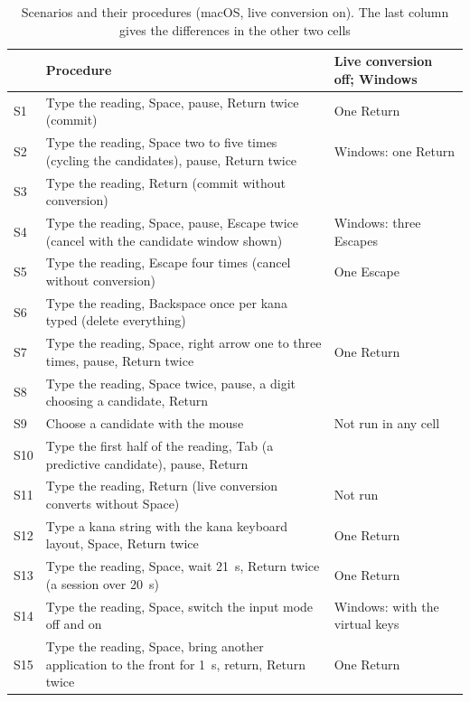 \begin{table}[t]
\caption{Scenarios and their procedures (macOS, live conversion on). The last column gives the differences in the other
two cells}
\label{tab:scenarios}
\begin{tabular}{L{0.08}L{0.52}L{0.40}}
\toprule
& Procedure & Live conversion off; Windows \\
\midrule
S1 & Type the reading, Space, pause, Return twice (commit) & One Return \\
S2 & Type the reading, Space two to five times (cycling the candidates), pause, Return twice & Windows: one Return \\
S3 & Type the reading, Return (commit without conversion) & \\
S4 & Type the reading, Space, pause, Escape twice (cancel with the candidate window shown) & Windows: three Escapes \\
S5 & Type the reading, Escape four times (cancel without conversion) & One Escape \\
S6 & Type the reading, Backspace once per kana typed (delete everything) & \\
S7 & Type the reading, Space, right arrow one to three times, pause, Return twice & One Return \\
S8 & Type the reading, Space twice, pause, a digit choosing a candidate, Return & \\
S9 & Choose a candidate with the mouse & Not run in any cell \\
S10 & Type the first half of the reading, Tab (a predictive candidate), pause, Return & \\
S11 & Type the reading, Return (live conversion converts without Space) & Not run \\
S12 & Type a kana string with the kana keyboard layout, Space, Return twice & One Return \\
S13 & Type the reading, Space, wait 21~s, Return twice (a session over 20~s) & One Return \\
S14 & Type the reading, Space, switch the input mode off and on & Windows: with the virtual keys \\
S15 & Type the reading, Space, bring another application to the front for 1~s, return, Return twice & One Return \\
\bottomrule
\end{tabular}
\end{table}

